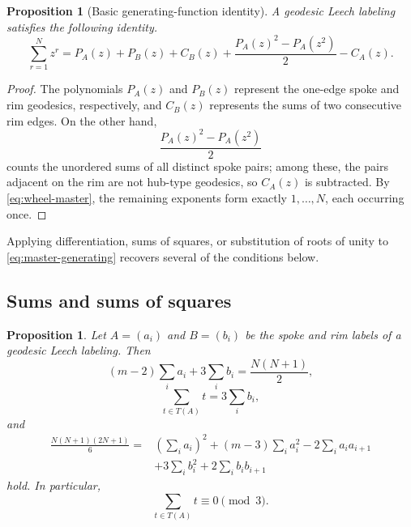 \documentclass[11pt]{article}
\newtheorem{proposition}[theorem]{Proposition}
\theoremstyle{definition}
\theoremstyle{remark}
\numberwithin{equation}{section}
\begin{document}
\begin{proposition}[Basic generating-function identity]\label{prop:master-generating}
A geodesic Leech labeling satisfies the following identity.
\begin{equation}\label{eq:master-generating}
  \sum_{r=1}^{N}z^r
  =P_A(z)+P_B(z)+C_B(z)
  +\frac{P_A(z)^2-P_A(z^2)}2-C_A(z).
\end{equation}
\end{proposition}

\begin{proof}
The polynomials $P_A(z)$ and $P_B(z)$ represent the one-edge spoke and rim geodesics, respectively, and $C_B(z)$ represents the sums of two consecutive rim edges. On the other hand,
\[
  \frac{P_A(z)^2-P_A(z^2)}2
\]
counts the unordered sums of all distinct spoke pairs; among these, the pairs adjacent on the rim are not hub-type geodesics, so $C_A(z)$ is subtracted. By \eqref{eq:wheel-master}, the remaining exponents form exactly $1,\ldots,N$, each occurring once.
\end{proof}

Applying differentiation, sums of squares, or substitution of roots of unity to \eqref{eq:master-generating} recovers several of the conditions below.

\subsection{Sums and sums of squares}

\begin{proposition}\label{prop:moment-identities}
Let $A=(a_i)$ and $B=(b_i)$ be the spoke and rim labels of a geodesic Leech labeling. Then
\begin{equation}\label{eq:first-moment}
  (m-2)\sum_i a_i+3\sum_i b_i=\frac{N(N+1)}2,
\end{equation}
\begin{equation}\label{eq:residual-sum}
  \sum_{t\in T(A)}t=3\sum_i b_i,
\end{equation}
and
\begin{equation}\label{eq:second-moment}
\begin{aligned}
  \frac{N(N+1)(2N+1)}6
  ={}&\left(\sum_i a_i\right)^2
  +(m-3)\sum_i a_i^2
  -2\sum_i a_i a_{i+1}\\
  &+3\sum_i b_i^2
  +2\sum_i b_i b_{i+1}
\end{aligned}
\end{equation}
hold. In particular,
\[
  \sum_{t\in T(A)}t\equiv0\pmod3.
\]
\end{proposition}
\end{document}
